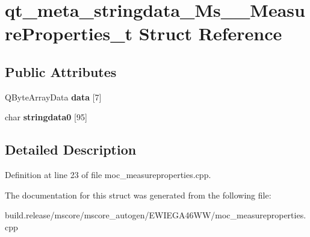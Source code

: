 \hypertarget{structqt__meta__stringdata___ms_____measure_properties__t}{}\section{qt\+\_\+meta\+\_\+stringdata\+\_\+\+Ms\+\_\+\+\_\+\+Measure\+Properties\+\_\+t Struct Reference}
\label{structqt__meta__stringdata___ms_____measure_properties__t}
\subsection*{Public Attributes}
\begin{DoxyCompactItemize}
\item 
\mbox{\label{structqt__meta__stringdata___ms_____measure_properties__t_a6372a29d867e67172cef25f833cae0eb}} 
Q\+Byte\+Array\+Data {\bfseries data} \mbox{[}7\mbox{]}
\item 
\mbox{\label{structqt__meta__stringdata___ms_____measure_properties__t_a45ca867d00a1decdcd8fd8f2cabf36e1}} 
char {\bfseries stringdata0} \mbox{[}95\mbox{]}
\end{DoxyCompactItemize}


\subsection{Detailed Description}


Definition at line 23 of file moc\+\_\+measureproperties.\+cpp.



The documentation for this struct was generated from the following file\+:\begin{DoxyCompactItemize}
\item 
build.\+release/mscore/mscore\+\_\+autogen/\+E\+W\+I\+E\+G\+A46\+W\+W/moc\+\_\+measureproperties.\+cpp\end{DoxyCompactItemize}
